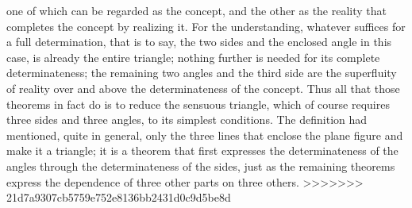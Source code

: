one of which can be regarded as the concept,
and the other as the reality
that completes the concept by realizing it.
For the understanding, whatever suffices for a full determination,
that is to say, the two sides and the enclosed angle in this case,
is already the entire triangle;
nothing further is needed for its complete determinateness;
the remaining two angles and the third side are
the superfluity of reality over and above
the determinateness of the concept.
Thus all that those theorems in fact do is
to reduce the sensuous triangle,
which of course requires
three sides and three angles,
to its simplest conditions.
The definition had mentioned,
quite in general,
only the three lines that enclose the plane figure
and make it a triangle;
it is a theorem that first expresses
the determinateness of the angles
through the determinateness of the sides,
just as the remaining theorems express
the dependence of three other parts on three others.
>>>>>>> 21d7a9307cb5759e752e8136bb2431d0c9d5be8d

